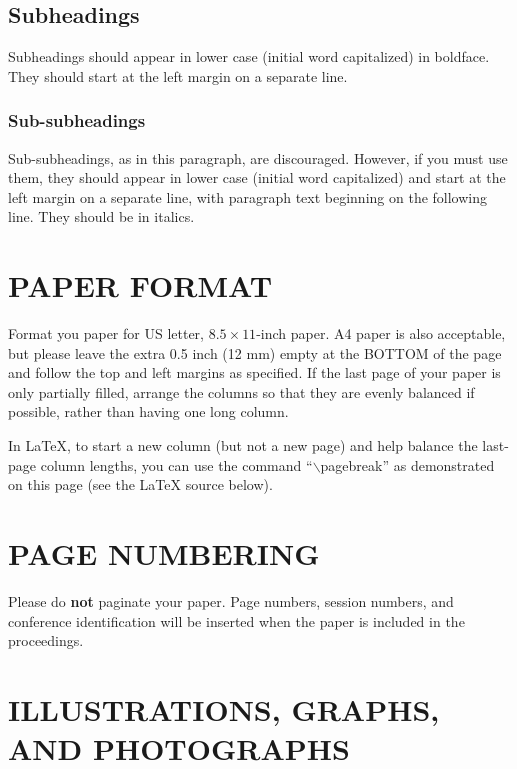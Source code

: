 \documentclass{article}
\begin{document}
\subsection{Subheadings}
\label{ssec:subhead}

Subheadings should appear in lower case (initial word capitalized) in
boldface.  They should start at the left margin on a separate line.

\subsubsection{Sub-subheadings}
\label{sssec:subsubhead}

Sub-subheadings, as in this paragraph, are discouraged. However, if you
must use them, they should appear in lower case (initial word
capitalized) and start at the left margin on a separate line, with paragraph
text beginning on the following line.  They should be in italics.

\section{PAPER FORMAT}
\label{sec:print}

Format you paper for US letter, $8.5 \times 11$-inch paper.
A4 paper is also acceptable, but please leave the extra 0.5 inch (12 mm)
empty at the BOTTOM of the page and follow the top and left margins as
specified.  If the last page of your paper is only partially filled, arrange
the columns so that they are evenly balanced if possible, rather than having
one long column.

In LaTeX, to start a new column (but not a new page) and help balance the
last-page column lengths, you can use the command ``$\backslash$pagebreak'' as
demonstrated on this page (see the LaTeX source below).

\section{PAGE NUMBERING}
\label{sec:page}

Please do {\bf not} paginate your paper.  Page numbers, session numbers, and
conference identification will be inserted when the paper is included in the
proceedings.

\section{ILLUSTRATIONS, GRAPHS, AND PHOTOGRAPHS}
\label{sec:illust}
\end{document}
